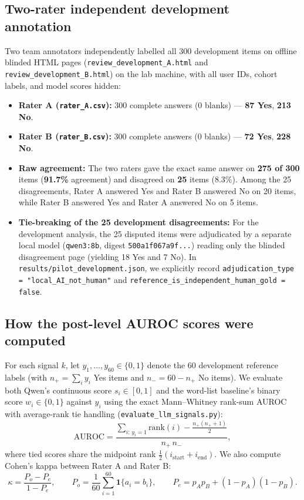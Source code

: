 \documentclass[11pt,a4paper]{article}
\begin{document}
\subsection{Two-rater independent development annotation}
Two team annotators independently labelled all 300 development items on offline blinded HTML pages (\texttt{review\_development\_A.html} and \texttt{review\_development\_B.html}) on the lab machine, with all user IDs, cohort labels, and model scores hidden:
\begin{itemize}[nosep]
\item \textbf{Rater A (\texttt{rater\_A.csv}):} 300 complete answers (0 blanks) --- \textbf{87 Yes}, \textbf{213 No}.
\item \textbf{Rater B (\texttt{rater\_B.csv}):} 300 complete answers (0 blanks) --- \textbf{72 Yes}, \textbf{228 No}.
\item \textbf{Raw agreement:} The two raters gave the exact same answer on \textbf{275 of 300} items (\textbf{91.7\%} agreement) and disagreed on \textbf{25} items (8.3\%). Among the 25 disagreements, Rater A answered Yes and Rater B answered No on 20 items, while Rater B answered Yes and Rater A answered No on 5 items.
\item \textbf{Tie-breaking of the 25 development disagreements:} For the development analysis, the 25 disputed items were adjudicated by a separate local model (\texttt{qwen3:8b}, digest \texttt{500a1f067a9f...}) reading only the blinded disagreement page (yielding 18 Yes and 7 No). In \texttt{results/pilot\_development.json}, we explicitly record \texttt{adjudication\_type = "local\_AI\_not\_human"} and \texttt{reference\_is\_independent\_human\_gold = false}.
\end{itemize}

\subsection{How the post-level AUROC scores were computed}
For each signal $k$, let $y_1,\dots,y_{60} \in \{0,1\}$ denote the 60 development reference labels (with $n_+ = \sum_i y_i$ Yes items and $n_- = 60 - n_+$ No items). We evaluate both Qwen's continuous score $s_i \in [0,1]$ and the word-list baseline's binary score $w_i \in \{0,1\}$ against $y_i$ using the exact Mann--Whitney rank-sum AUROC with average-rank tie handling (\texttt{evaluate\_llm\_signals.py}):
\begin{equation}
\mathrm{AUROC} = \frac{\sum_{i:\,y_i = 1} \mathrm{rank}(i) - \frac{n_+(n_+ + 1)}{2}}{n_+ \, n_-},
\end{equation}
where tied scores share the midpoint rank $\frac{1}{2}(i_{\mathrm{start}} + i_{\mathrm{end}})$. We also compute Cohen's kappa between Rater A and Rater B:
\begin{equation}
\kappa = \frac{P_o - P_e}{1 - P_e}, \qquad
P_o = \frac{1}{60}\sum_{i=1}^{60} \mathbf{1}\{a_i = b_i\}, \qquad
P_e = p_A p_B + (1 - p_A)(1 - p_B).
\end{equation}
\end{document}
